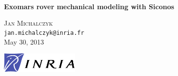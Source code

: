\begin{titlepage}
\begin{center}

{\huge \bfseries Exomars rover mechanical modeling with Siconos}

\vspace{2cm} 

\textsc{Jan Michalczyk} \\

\texttt{jan.michalczyk@inria.fr} \\[2cm] 

{May 30, 2013}

\vspace{2cm} 

\includegraphics[width=0.29\textwidth]{INRIA}

\end{center}
\end{titlepage}

